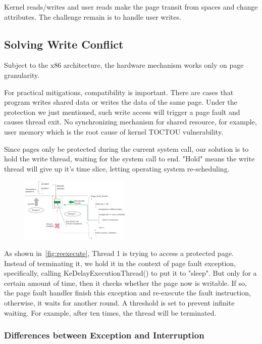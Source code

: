 Kernel reads/writes and user reads make the page transit from spaces and change attributes. The challenge remain is to handle user writes. 


\subsection{Solving Write Conflict }
Subject to the x86 architecture, the hardware mechanism works only on page granularity.

For practical mitigations, compatibility is important. There are cases that program writes shared data or writes the data of the same page. Under the protection we just mentioned, such write access will trigger a page fault and causes thread exit. No synchronizing mechanism for shared resource, for example, user memory which is the root cause of kernel TOCTOU vulnerability. 

Since pages only be protected during the current system call, our solution is to hold the write thread, waiting for the system call to end. "Hold" means the write thread will give up it's time slice, letting operating system re-scheduling. 

\begin{figure}[th]
  \includegraphics[width=0.47\textwidth]{figures/reexecute}
  \centering
  \caption{}
  \label{fig:reexecute}
\end{figure}

As shown in~\autoref{fig:reexecute}, Thread 1 is trying to access a protected page. Instead of terminating it, we hold it in the context of page fault exception, specifically, calling KeDelayExecutionThread() to put it to "sleep". But only for a certain amount of time, then it checks whether the page now is writable. If so, the page fault handler finish this exception and re-execute the fault instruction, otherwise, it waits for another round. A threshold is set to prevent infinite waiting. For example, after ten times, the thread will be terminated.

\subsubsection{Differences between Exception and Interruption}

